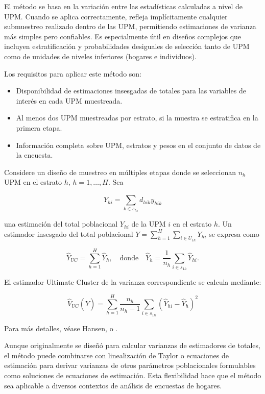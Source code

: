 \documentclass[
  spanish,
  12pt,
]{book}
\providecommand{\tightlist}{%
  \setlength{\itemsep}{0pt}\setlength{\parskip}{0pt}}
\begin{document}
El método se basa en la variación entre las estadísticas calculadas a nivel de UPM. Cuando se aplica correctamente, refleja implícitamente cualquier submuestreo realizado dentro de las UPM, permitiendo estimaciones de varianza más simples pero confiables. Es especialmente útil en diseños complejos que incluyen estratificación y probabilidades desiguales de selección tanto de UPM como de unidades de niveles inferiores (hogares e individuos).

Los requisitos para aplicar este método son:

\begin{itemize}
\tightlist
\item
  Disponibilidad de estimaciones insesgadas de totales para las variables de interés en cada UPM muestreada.
\item
  Al menos dos UPM muestreadas por estrato, si la muestra se estratifica en la primera etapa.
\item
  Información completa sobre UPM, estratos y pesos en el conjunto de datos de la encuesta.
\end{itemize}

Considere un diseño de muestreo en múltiples etapas donde se seleccionan \(n_h\) UPM en el estrato \(h\), \(h=1,\dots,H\). Sea

\[
\hat{Y}_{hi} = \sum_{k\in s_{hi}} d_{hik} y_{hik}
\]

una estimación del total poblacional \(Y_{hi}\) de la UPM \(i\) en el estrato \(h\). Un estimador insesgado del total poblacional \(Y = \sum_{h=1}^H \sum_{i \in U_{1h}} Y_{hi}\) se expresa como

\[
\hat{Y}_{UC} = \sum_{h=1}^H \hat{Y}_h, \quad \text{donde} \quad \hat{Y}_h = \frac{1}{n_h} \sum_{i\in s_{1h}} \hat{Y}_{hi}.
\]

El estimador Ultimate Cluster de la varianza correspondiente se calcula mediante:

\[
\hat{V}_{UC}(\hat{Y}) = \sum_{h=1}^H \frac{n_h}{n_h-1} \sum_{i \in s_{1h}} (\hat{Y}_{hi} - \hat{Y}_h)^2
\]

Para más detalles, véase Hansen, \citet[p.~258]{hansen1953sample} o \citet{wolter2007}.

Aunque originalmente se diseñó para calcular varianzas de estimadores de totales, el método puede combinarse con linealización de Taylor o ecuaciones de estimación para derivar varianzas de otros parámetros poblacionales formulables como soluciones de ecuaciones de estimación. Esta flexibilidad hace que el método sea aplicable a diversos contextos de análisis de encuestas de hogares.
\end{document}
